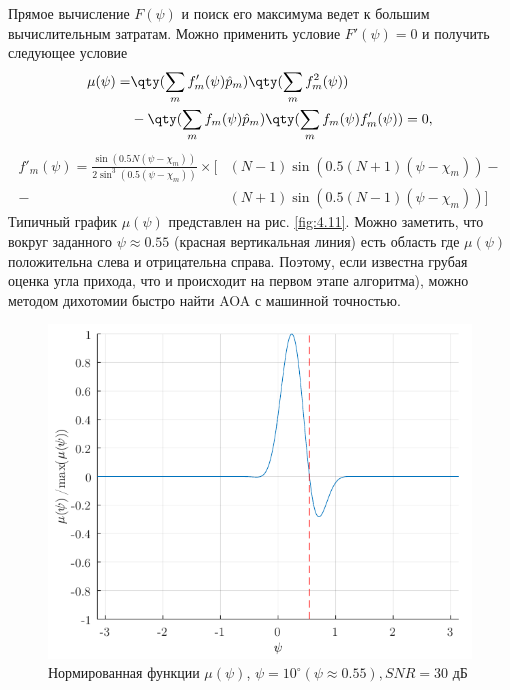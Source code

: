 Прямое вычисление $F(\psi)$ и поиск его максимума ведет к большим вычислительным затратам. Можно применить условие $F'(\psi) =0$ и получить следующее условие
\begin{equation}
    \label{eq:4.31}
    \begin{aligned}
        \mu(\psi) = &
        \qty(\sum\limits_m f'_m(\psi) \hat p_m) \qty(\sum\limits_m f^2_m(\psi))                              \\
                    & - \qty(\sum\limits_m f_m(\psi)\hat p_m) \qty(\sum\limits_m f_m (\psi) f'_m(\psi)) = 0,
    \end{aligned}
\end{equation}
\begin{equation}
    \label{eq:4.32}
    \begin{aligned}
        f'_m(\psi) = \frac{\sin(0.5N (\psi - \chi_m))}{2\sin^3(0.5(\psi - \chi_m))} \times
        \big[
          & (N-1)\sin(0.5(N+1) (\psi - \chi_m)) - \\
        - & (N+1) \sin(0.5(N-1)(\psi - \chi_m))
            \big]
    \end{aligned}
\end{equation}
Типичный график $\mu(\psi)$ представлен на рис. \ref{fig:4.11}. Можно заметить, что вокруг заданного $\psi \approx 0.55$ (красная вертикальная линия) есть область где
$\mu(\psi)$ положительна слева и отрицательна справа. Поэтому, если известна грубая оценка угла прихода,
что и происходит на первом этапе алгоритма),
можно методом дихотомии быстро найти AOA с машинной точностью.
\begin{figure}[ht]
    \centering
    \includegraphics[width=0.75\linewidth]{figs/fig4.11}
    \caption{Нормированная функции $\mu(\psi)$, $\psi=10^{\circ} (\psi \approx 0.55), SNR=30$ дБ}
    \label{fig:4.12}
\end{figure}

